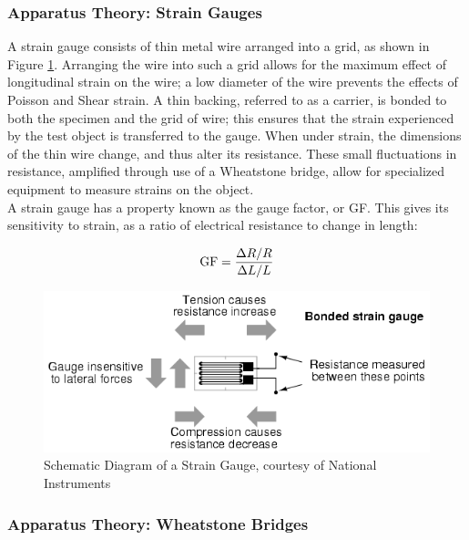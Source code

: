 \documentclass[12pt]{article}
\begin{document}
\subsubsection{Apparatus Theory: Strain Gauges}
A strain gauge consists of thin metal wire arranged into a grid, as shown in Figure \ref{strain}. Arranging the wire into such a grid allows for the maximum effect of longitudinal strain on the wire; a low diameter of the wire prevents the effects of Poisson and Shear strain. \cite{straingaugeni} A thin backing, referred to as a carrier, is bonded to both the specimen and the grid of wire; this ensures that the strain experienced by the test object is transferred to the gauge. When under strain, the dimensions of the thin wire change, and thus alter its resistance. These small fluctuations in resistance, amplified through use of a Wheatstone bridge, allow for specialized equipment to measure strains on the object. \\

A strain gauge has a property known as the gauge factor, or GF. This gives its sensitivity to strain, as a ratio of electrical resistance to change in length:

\begin{equation}\label{gf}
\textnormal{GF} = \frac{\Delta R/R}{\Delta L/L}
\end{equation}

\begin{figure}[H]
\includegraphics[width=\linewidth]{00204}
\centering
\caption{\label{strain} Schematic Diagram of a Strain Gauge, courtesy of National Instruments}
\end{figure}
\subsubsection{Apparatus Theory: Wheatstone Bridges}
\end{document}
